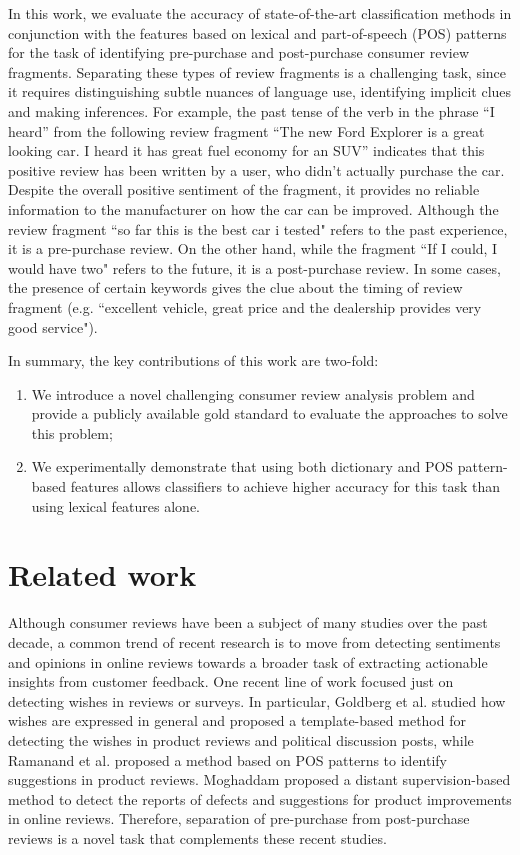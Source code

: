 \documentclass[runningheads,a4paper]{llncs}
\begin{document}
In this work, we evaluate the accuracy of state-of-the-art classification methods in conjunction with the features based on lexical and part-of-speech (POS) patterns for the task
of identifying pre-purchase and post-purchase consumer review fragments. Separating these types of review fragments is a challenging task, since it requires distinguishing subtle
nuances of language use, identifying implicit clues and making inferences. For example, the past tense of the verb in the phrase ``I heard'' from the following review fragment
``The new Ford Explorer is a great looking car. I heard it has great fuel economy for an SUV'' indicates that this positive review has been written by a user, who didn't actually
purchase the car. Despite the overall positive sentiment of the fragment, it provides no reliable information to the manufacturer on how the car can be improved. Although the
review fragment ``so far this is the best car i tested" refers to the past experience, it is a pre-purchase review. On the other hand, while the fragment ``If I could, I would have
two" refers to the future, it is a post-purchase review. In some cases, the presence of certain keywords gives the clue about the timing of review fragment (e.g. ``excellent
vehicle, great price and the dealership provides very good service").

In summary, the key contributions of this work are two-fold:
\begin{enumerate}
 \item We introduce a novel challenging consumer review analysis problem and provide a publicly available gold standard to evaluate the approaches to solve this problem;
 \item We experimentally demonstrate that using both dictionary and POS pattern-based features allows classifiers to achieve higher accuracy for this task than using
lexical features alone.
\end{enumerate}

\section{Related work}

Although consumer reviews have been a subject of many studies over the past decade, a common trend of recent research is to move from detecting sentiments and opinions in online
reviews towards a broader task of extracting actionable insights from customer feedback. One recent line of work focused just on detecting wishes \cite{Ramanand2010Wishes}
\cite{Goldberg2009Wishes} in reviews or surveys. In particular, Goldberg et al. \cite{Goldberg2009Wishes} studied how wishes are expressed in general and
proposed a template-based method for detecting the wishes in product reviews and political discussion posts, while Ramanand et al. \cite{Ramanand2010Wishes} proposed a method based
on POS patterns to identify suggestions in product reviews. Moghaddam \cite{Moghaddam2015Defects} proposed a distant supervision-based method to detect the reports of defects and
suggestions for product improvements in online reviews. Therefore, separation of pre-purchase from post-purchase reviews is a novel task that complements these recent
studies.
\end{document}
